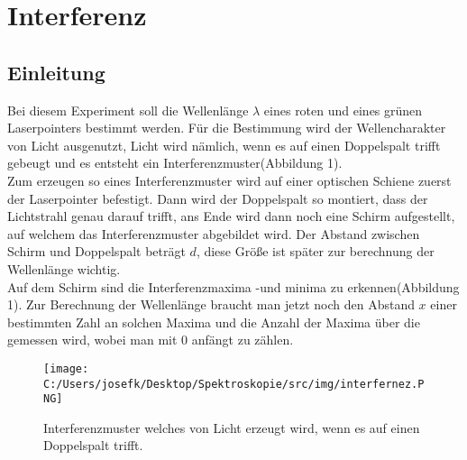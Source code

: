 \section{Interferenz}

\subsection{Einleitung}
Bei diesem Experiment soll die Wellenlänge $\lambda$ eines roten und eines grünen Laserpointers bestimmt werden.
Für die Bestimmung wird der Wellencharakter von Licht ausgenutzt, Licht wird nämlich, wenn es auf einen Doppelspalt trifft gebeugt und es entsteht ein Interferenzmuster(Abbildung 1).\\
Zum erzeugen so eines Interferenzmuster wird auf einer optischen Schiene zuerst der Laserpointer befestigt. Dann wird der Doppelspalt so montiert, dass der Lichtstrahl genau darauf trifft,
ans Ende wird dann noch eine Schirm aufgestellt, auf welchem das Interferenzmuster abgebildet wird. Der Abstand zwischen Schirm und Doppelspalt beträgt $d$, diese Größe ist später
zur berechnung der Wellenlänge wichtig. \\
Auf dem Schirm sind die Interferenzmaxima -und minima zu erkennen(Abbildung 1). Zur Berechnung der Wellenlänge braucht man jetzt noch den Abstand $x$ einer bestimmten Zahl an solchen Maxima und die Anzahl
der Maxima über die gemessen wird, wobei man mit 0 anfängt zu zählen.
\begin{figure}[H]
	\texttt{[image: C:/Users/josefk/Desktop/Spektroskopie/src/img/interfernez.PNG]}
	\caption{Interferenzmuster welches von Licht erzeugt wird, wenn es auf einen Doppelspalt trifft.}
\end{figure}

